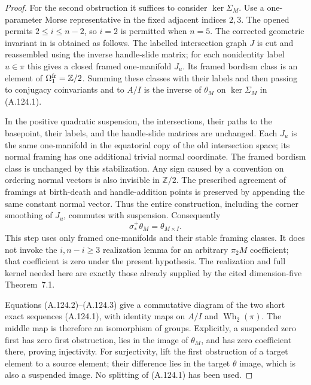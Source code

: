\begin{proof}
For the second obstruction it suffices to consider
$\ker\Sigma_M$. Use a one-parameter Morse representative in
the fixed adjacent indices $2,3$. The opened
\cite[Part~I, Chapter~V, Theorem~3.1(a), p.~184;
Part~II, Section~2, p.~244]{HatcherWagoner1973}
permits $2\leq i\leq n-2$, so $i=2$ is permitted when $n=5$.
The corrected geometric invariant in
\cite[Section~7, items~(1)--(12), p.~24]{Igusa2025}
is obtained as follows. The labelled intersection graph $J$
is cut and reassembled using the inverse handle-slide matrix;
for each nonidentity label $u\in\pi$ this gives a closed
framed one-manifold $J_u$. Its framed bordism class is an
element of $\Omega_1^{\rm fr}=\mathbb Z/2$. Summing these
classes with their labels and then passing to conjugacy
coinvariants and to $A/I$ is the inverse of $\theta_M$ on
$\ker\Sigma_M$ in (A.124.1).

In the positive quadratic suspension, the intersections,
their paths to the basepoint, their labels, and the
handle-slide matrices are unchanged. Each $J_u$ is the same
one-manifold in the equatorial copy of the old intersection
space; its normal framing has one additional trivial normal
coordinate. The framed bordism class is unchanged by this
stabilization. Any sign caused by a convention on ordering
normal vectors is also invisible in $\mathbb Z/2$.
The prescribed agreement of framings at birth-death and
handle-addition points is preserved by appending the same
constant normal vector. Thus the entire construction, including
the corner smoothing of $J_u$, commutes with suspension.
Consequently
\[
 \sigma^+_*\theta_M=\theta_{M\times I}.                \tag{A.124.3}
\]
This step uses only framed one-manifolds and their stable
framing classes. It does not invoke the $i,n-i\geq3$
realization lemma for an arbitrary $\pi_2M$ coefficient;
that coefficient is zero under the present hypothesis.
The realization and full kernel needed here are exactly those
already supplied by the cited dimension-five Theorem~7.1.

Equations (A.124.2)--(A.124.3) give a commutative diagram of
the two short exact sequences (A.124.1), with identity maps
on $A/I$ and $\operatorname{Wh}_2(\pi)$. The middle map is
therefore an isomorphism of groups. Explicitly, a suspended
zero first has zero first obstruction, lies in the image of
$\theta_M$, and has zero coefficient there, proving
injectivity. For surjectivity, lift the first obstruction of
a target element to a source element; their difference lies
in the target $\theta$ image, which is also a suspended image.
No splitting of (A.124.1) has been used.


\end{proof}
